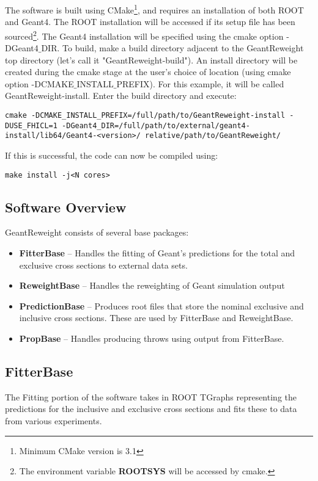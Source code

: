 \documentclass[12pt]{article}
\begin{document}
The software is built using CMake\footnote{Minimum CMake version is 3.1}, and requires an installation of both ROOT and Geant4. The ROOT installation will be accessed if its setup file has been sourced\footnote{The environment variable \textbf{ROOTSYS} will be accessed by cmake.}. The Geant4 installation will be specified using the cmake option -DGeant4$\_$DIR. To build, make a build directory adjacent to the GeantReweight top directory (let's call it "GeantReweight-build"). An install directory will be created during the cmake stage at the user's choice of location (using cmake option -DCMAKE$\_$INSTALL$\_$PREFIX). For this example, it will be called GeantReweight-install. Enter the build directory and execute:
\begin{lstlisting}
cmake -DCMAKE_INSTALL_PREFIX=/full/path/to/GeantReweight-install -DUSE_FHICL=1 -DGeant4_DIR=/full/path/to/external/geant4-install/lib64/Geant4-<version>/ relative/path/to/GeantReweight/
\end{lstlisting}

If this is successful, the code can now be compiled using:
\begin{lstlisting}
make install -j<N cores>
\end{lstlisting}

\subsection{Software Overview}

GeantReweight consists of several base packages:
\begin{itemize}
	\item \textbf{FitterBase} -- Handles the fitting of Geant's predictions for the total and exclusive cross sections to external data sets.
	\item \textbf{ReweightBase} -- Handles the reweighting of Geant simulation output
	\item \textbf{PredictionBase} -- Produces root files that store the nominal exclusive and inclusive cross sections. These are used by FitterBase and ReweightBase. 
	\item \textbf{PropBase} -- Handles producing throws using output from FitterBase.
\end{itemize}

\subsection{FitterBase}
The Fitting portion of the software takes in ROOT TGraphs representing the predictions for the inclusive and exclusive cross sections and fits these to data from various experiments.
\end{document}
